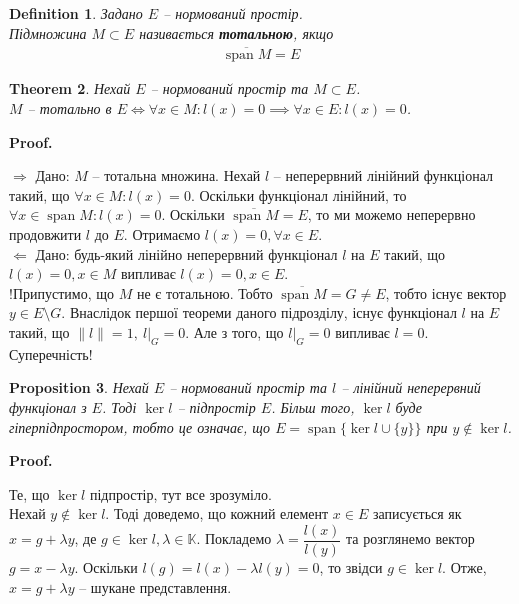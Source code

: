 \documentclass[a4paper, 10pt]{article}
\makeatletter
\def\rightproof{$\boxed{\Rightarrow}$ }
\def\leftproof{$\boxed{\Leftarrow}$ }
\theoremstyle{theoremdd}
\newtheorem{theorem}{Theorem}[subsection]
\theoremstyle{theoremdd}
\newtheorem{definition}[theorem]{Definition}
\theoremstyle{theoremdd}
\theoremstyle{theoremdd}
\theoremstyle{theoremdd}
\newtheorem{proposition}[theorem]{Proposition}
\theoremstyle{theoremdd}
\theoremstyle{theoremdd}
\theoremstyle{theoremdd}
\renewenvironment{proof}[1][Proof.\\]{\par
\pushQED{\hfill \qed}%
\normalfont \topsep6\p@\@plus6\p@\relax
\trivlist
\item\relax
{\bfseries
#1\@addpunct{.}}\hspace\labelsep\ignorespaces
}{%
\popQED\endtrivlist\@endpefalse
}
\DeclareMathOperator{\linspan}{span}
\makeatother
\begin{document}
\begin{definition}
Задано $E$ -- нормований простір.\\
Підмножина $M \subset E$ називається \textbf{тотальною}, якщо
\begin{align*}
\overline{\linspan{M}} = E
\end{align*}
\end{definition}

\begin{theorem}
Нехай $E$ -- нормований простір та $M \subset E$.\\
$M$ -- тотально в $E \iff \forall x \in M: l(x) = 0 \implies \forall x \in E: l(x) = 0$.
\end{theorem}

\begin{proof}
\rightproof Дано: $M$ -- тотальна множина. Нехай $l$ -- неперервний лінійний функціонал такий, що $\forall x \in M: l(x) = 0$. Оскільки функціонал лінійний, то $\forall x \in \linspan{M}: l(x) = 0$. Оскільки $\overline{\linspan{M}} = E$, то ми можемо неперервно продовжити $l$ до $E$. Отримаємо $l(x) = 0, \forall x \in E$.
\bigskip \\
\leftproof Дано: будь-який лінійно неперервний функціонал $l $ на $E$ такий, що $l(x) = 0, x \in M$ випливає $l(x) = 0, x \in E$.\\
!Припустимо, що $M$ не є тотальною. Тобто $\overline{\linspan{M}} = G \neq E$, тобто існує вектор $y \in E \setminus G$. Внаслідок першої теореми даного підрозділу, існує функціонал $l$ на $E$ такий, що $\|l\| = 1,\ l|_G = 0$. Але з того, що $l|_G = 0$ випливає $l = 0$. Суперечність!
\end{proof}

\begin{proposition}
\label{kernel_as_subspace}
Нехай $E$ -- нормований простір та $l$ -- лінійний неперервний функціонал з $E$. Тоді $\ker l$ -- підпростір $E$. Більш того, $\ker l$ буде гіперпідпростором, тобто це означає, що $E = \linspan\{\ker l \cup \{y\}\}$ при $y \notin \ker l$.
\end{proposition}

\begin{proof}
Те, що $\ker l$ підпростір, тут все зрозуміло.\\
Нехай $y \notin \ker l$. Тоді доведемо, що кожний елемент $x \in E$ записується як $x = g + \lambda y$, де $g \in \ker l, \lambda \in \mathbb{K}$. Покладемо $\lambda = \dfrac{l(x)}{l(y)}$ та розглянемо вектор $g = x - \lambda y$. Оскільки $l(g) = l(x) - \lambda l(y) = 0$, то звідси $g \in \ker l$. Отже, $x = g + \lambda y$ -- шукане представлення.
\end{proof}
\end{document}
